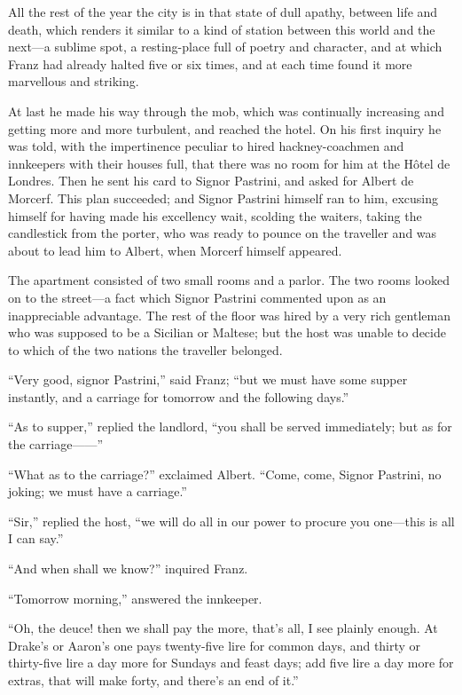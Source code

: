 All the rest of the year the city is in that state of dull apathy,
between life and death, which renders it similar to a kind of station
between this world and the next—a sublime spot, a resting-place full of
poetry and character, and at which Franz had already halted five or six
times, and at each time found it more marvellous and striking.

At last he made his way through the mob, which was continually
increasing and getting more and more turbulent, and reached the hotel.
On his first inquiry he was told, with the impertinence peculiar to
hired hackney-coachmen and innkeepers with their houses full, that
there was no room for him at the Hôtel de Londres. Then he sent his
card to Signor Pastrini, and asked for Albert de Morcerf. This plan
succeeded; and Signor Pastrini himself ran to him, excusing himself for
having made his excellency wait, scolding the waiters, taking the
candlestick from the porter, who was ready to pounce on the traveller
and was about to lead him to Albert, when Morcerf himself appeared.

The apartment consisted of two small rooms and a parlor. The two rooms
looked on to the street—a fact which Signor Pastrini commented upon as
an inappreciable advantage. The rest of the floor was hired by a very
rich gentleman who was supposed to be a Sicilian or Maltese; but the
host was unable to decide to which of the two nations the traveller
belonged.

“Very good, signor Pastrini,” said Franz; “but we must have some supper
instantly, and a carriage for tomorrow and the following days.”

“As to supper,” replied the landlord, “you shall be served immediately;
but as for the carriage——”

“What as to the carriage?” exclaimed Albert. “Come, come, Signor
Pastrini, no joking; we must have a carriage.”

“Sir,” replied the host, “we will do all in our power to procure you
one—this is all I can say.”

“And when shall we know?” inquired Franz.

“Tomorrow morning,” answered the innkeeper.

“Oh, the deuce! then we shall pay the more, that’s all, I see plainly
enough. At Drake’s or Aaron’s one pays twenty-five lire for common
days, and thirty or thirty-five lire a day more for Sundays and feast
days; add five lire a day more for extras, that will make forty, and
there’s an end of it.”

